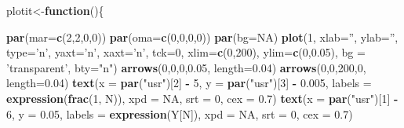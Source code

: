 \documentclass[12pt,oneside]{reedthesis}
\newenvironment{Shaded}{\begin{snugshade}}{\end{snugshade}}
\newcommand{\ControlFlowTok}[1]{\textcolor[rgb]{0.13,0.29,0.53}{\textbf{#1}}}
\newcommand{\DataTypeTok}[1]{\textcolor[rgb]{0.13,0.29,0.53}{#1}}
\newcommand{\DecValTok}[1]{\textcolor[rgb]{0.00,0.00,0.81}{#1}}
\newcommand{\FloatTok}[1]{\textcolor[rgb]{0.00,0.00,0.81}{#1}}
\newcommand{\KeywordTok}[1]{\textcolor[rgb]{0.13,0.29,0.53}{\textbf{#1}}}
\newcommand{\NormalTok}[1]{#1}
\newcommand{\OperatorTok}[1]{\textcolor[rgb]{0.81,0.36,0.00}{\textbf{#1}}}
\newcommand{\OtherTok}[1]{\textcolor[rgb]{0.56,0.35,0.01}{#1}}
\newcommand{\StringTok}[1]{\textcolor[rgb]{0.31,0.60,0.02}{#1}}
\begin{document}
\vspace{0.4cm}
\begin{Shaded}
\begin{Highlighting}[]
\NormalTok{plotit<-}\ControlFlowTok{function}\NormalTok{()\{}

  \KeywordTok{par}\NormalTok{(}\DataTypeTok{mar=}\KeywordTok{c}\NormalTok{(}\DecValTok{2}\NormalTok{,}\DecValTok{2}\NormalTok{,}\DecValTok{0}\NormalTok{,}\DecValTok{0}\NormalTok{))}
  \KeywordTok{par}\NormalTok{(}\DataTypeTok{oma=}\KeywordTok{c}\NormalTok{(}\DecValTok{0}\NormalTok{,}\DecValTok{0}\NormalTok{,}\DecValTok{0}\NormalTok{,}\DecValTok{0}\NormalTok{))}
  \KeywordTok{par}\NormalTok{(}\DataTypeTok{bg=}\OtherTok{NA}\NormalTok{)}
  \KeywordTok{plot}\NormalTok{(}\DecValTok{1}\NormalTok{, }\DataTypeTok{xlab=}\StringTok{''}\NormalTok{, }\DataTypeTok{ylab=}\StringTok{''}\NormalTok{, }\DataTypeTok{type=}\StringTok{'n'}\NormalTok{, }\DataTypeTok{yaxt=}\StringTok{'n'}\NormalTok{, }\DataTypeTok{xaxt=}\StringTok{'n'}\NormalTok{, }\DataTypeTok{tck=}\DecValTok{0}\NormalTok{, }\DataTypeTok{xlim=}\KeywordTok{c}\NormalTok{(}\DecValTok{0}\NormalTok{,}\DecValTok{200}\NormalTok{), }\DataTypeTok{ylim=}\KeywordTok{c}\NormalTok{(}\DecValTok{0}\NormalTok{,}\FloatTok{0.05}\NormalTok{), }\DataTypeTok{bg =} \StringTok{'transparent'}\NormalTok{, }\DataTypeTok{bty=}\StringTok{"n"}\NormalTok{)}
  \KeywordTok{arrows}\NormalTok{(}\DecValTok{0}\NormalTok{,}\DecValTok{0}\NormalTok{,}\DecValTok{0}\NormalTok{,}\FloatTok{0.05}\NormalTok{, }\DataTypeTok{length=}\FloatTok{0.04}\NormalTok{)}
  \KeywordTok{arrows}\NormalTok{(}\DecValTok{0}\NormalTok{,}\DecValTok{0}\NormalTok{,}\DecValTok{200}\NormalTok{,}\DecValTok{0}\NormalTok{, }\DataTypeTok{length=}\FloatTok{0.04}\NormalTok{)}
  \KeywordTok{text}\NormalTok{(}\DataTypeTok{x =} \KeywordTok{par}\NormalTok{(}\StringTok{"usr"}\NormalTok{)[}\DecValTok{2}\NormalTok{] }\OperatorTok{-}\StringTok{ }\DecValTok{5}\NormalTok{,  }\DataTypeTok{y =} \KeywordTok{par}\NormalTok{(}\StringTok{"usr"}\NormalTok{)[}\DecValTok{3}\NormalTok{] }\OperatorTok{-}\StringTok{ }\FloatTok{0.005}\NormalTok{, }\DataTypeTok{labels =} \KeywordTok{expression}\NormalTok{(}\KeywordTok{frac}\NormalTok{(}\DecValTok{1}\NormalTok{, N)), }\DataTypeTok{xpd =} \OtherTok{NA}\NormalTok{, }\DataTypeTok{srt =} \DecValTok{0}\NormalTok{, }\DataTypeTok{cex =} \FloatTok{0.7}\NormalTok{)}
  \KeywordTok{text}\NormalTok{(}\DataTypeTok{x =} \KeywordTok{par}\NormalTok{(}\StringTok{"usr"}\NormalTok{)[}\DecValTok{1}\NormalTok{] }\OperatorTok{-}\StringTok{ }\DecValTok{6}\NormalTok{,  }\DataTypeTok{y =} \FloatTok{0.05}\NormalTok{, }\DataTypeTok{labels =} \KeywordTok{expression}\NormalTok{(Y[N]), }\DataTypeTok{xpd =} \OtherTok{NA}\NormalTok{, }\DataTypeTok{srt =} \DecValTok{0}\NormalTok{, }\DataTypeTok{cex =} \FloatTok{0.7}\NormalTok{)}

\end{Highlighting}
\end{Shaded}
\end{document}
